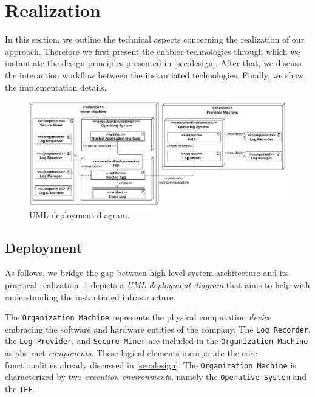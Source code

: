 \section{Realization}
\label{sec:realization}
In this section, we outline the technical aspects concerning the realization of our approach. Therefore we first present the enabler technologies through which we instantiate the design principles presented in \cref{sec:design}. After that, we discuss the interaction workflow between the instantiated technologies. Finally, we show the implementation details.
\begin{figure}[t]
\centering
\includegraphics[width=1\linewidth]{content/figures/deploymentdiagram2.pdf}
\caption{UML deployment diagram.}
\label{fig:deployment_diagram}
\end{figure}
\subsection{Deployment}
As follows, we bridge the gap between high-level system architecture and its practical realization. \cref{fig:deployment_diagram} depicts a \textit{UML deployment diagram} \cite{koch2002expressive} that aims to help with understanding the instantiated infrastructure. 

The \texttt{Organization Machine} represents the physical computation \textit{device} embracing the software and hardware entities of the company. The \texttt{Log Recorder}, the \texttt{Log Provider}, and \texttt{Secure Miner} are included in the \texttt{Organization Machine} as abstract \textit{components}. These logical elements incorporate the core functionalities already discussed in \cref{sec:design}. The \texttt{Organization Machine} is characterized by two \textit{execution environment}s, namely the \texttt{Operative System} and the \texttt{TEE}.

